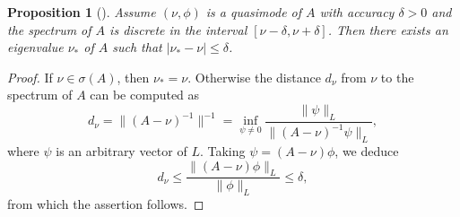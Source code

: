 \documentclass[reqno]{amsart}
\theoremstyle{plain}
\newtheorem{prop}{Proposition}
\numberwithin{equation}{section}
\renewcommand{\leq}{\leqslant}
\begin{document}
\begin{prop}[]\label{LemQuasimodes}
   Assume $(\nu, \phi)$ is a quasimode of $A$ with accuracy $\delta>0$ and  the spectrum of $A$ is discrete in  the interval
$[\nu-\delta, \nu+\delta]$. Then there exists an eigenvalue $\nu_*$ of  $A$ such that $|\nu_*-\nu|\leq\delta$.
\end{prop}
\begin{proof}
If $\nu\in \sigma(A)$, then $\nu_*=\nu$. Otherwise  the distance $d_\nu$ from $\nu$ to the spectrum of $A$  can be computed as
\begin{equation*}
  d_\nu=\|(A-\nu)^{-1}\|^{-1}
  =\inf_{\psi\neq0}\frac{\|\psi\|_L}{\|(A-\nu)^{-1}\psi\|_L},
\end{equation*}
where $\psi$ is an arbitrary vector of $L$. Taking $\psi=(A-\nu)\phi$, we deduce
\begin{equation*}
  d_\nu\leq \frac{\|(A-\nu)\phi\|_L}{\|\phi\|_L}\leq \delta,
\end{equation*}
from which the assertion  follows.
\end{proof}
\end{document}
